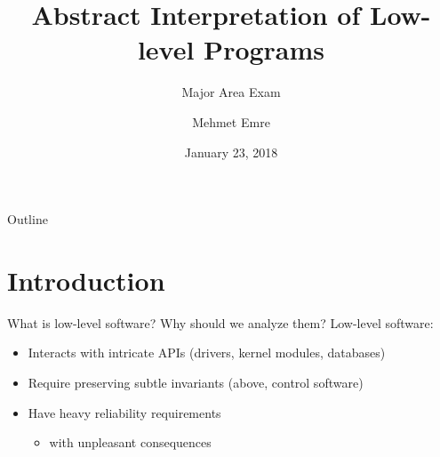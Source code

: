 \documentclass[aspectratio=169]{beamer}
\title[Major Area Exam]{Abstract Interpretation of Low-level Programs}
\subtitle{Major Area Exam}
\date{January 23, 2018}
\author{Mehmet Emre}
\institute[UCSB]{
  \normalsize
  {\large \bfseries Committee:}\\
  Ben Hardekopf (\textbf{Chair}) \quad
  Tevfik Bultan \quad
  Chandra Krintz
}
\begin{document}
\maketitle

\begin{frame}{Outline}
  \tableofcontents
\end{frame}

\section{Introduction}
\begin{frame}{What is low-level software? Why should we analyze them?}
Low-level software:
\begin{itemize}
\item Interacts with intricate APIs (drivers, kernel modules, databases)
\item Require preserving subtle invariants (above, control software)
\item Have heavy reliability requirements
\begin{itemize}
\item with unpleasant consequences %
\end{itemize}
\end{itemize}

\end{frame}
\end{document}
